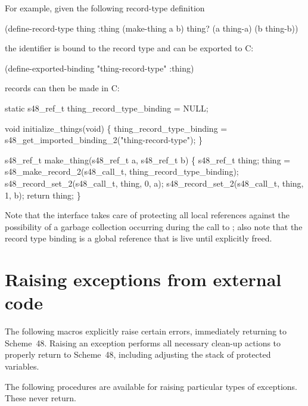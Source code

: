 For example, given the following record-type definition
\begin{example}
(define-record-type thing :thing
  (make-thing a b)
  thing?
  (a thing-a)
  (b thing-b))
\end{example}
 the identifier  is bound to the record type and can
 be exported to C:
\begin{example}
(define-exported-binding "thing-record-type" :thing)
\end{example}
 records can then be made in C:
\begin{example}
static s48_ref_t
  thing_record_type_binding = NULL;

void initialize_things(void)
\{
  thing_record_type_binding =
     s48_get_imported_binding_2("thing-record-type");
\}

s48_ref_t make_thing(s48_ref_t a, s48_ref_t b)
\{
  s48_ref_t thing;
  thing = s48_make_record_2(s48_call_t, thing_record_type_binding);
  s48_record_set_2(s48_call_t, thing, 0, a);
  s48_record_set_2(s48_call_t, thing, 1, b);
  return thing;
\}
\end{example}
Note that the interface takes care of protecting all local references 
 against the possibility of a garbage collection occurring during
 the call to ; also note that the record
 type binding is a global reference that is live until explicitly
 freed.

\section{Raising exceptions from external code}
\label{sec:exceptions}

The following macros explicitly raise certain errors, immediately
 returning to Scheme~48.
Raising an exception performs all
 necessary clean-up actions to properly return to Scheme~48, including
 adjusting the stack of protected variables.

The following procedures are available for raising particular
 types of exceptions.
These never return.

\begin{protos}
\end{protos}

